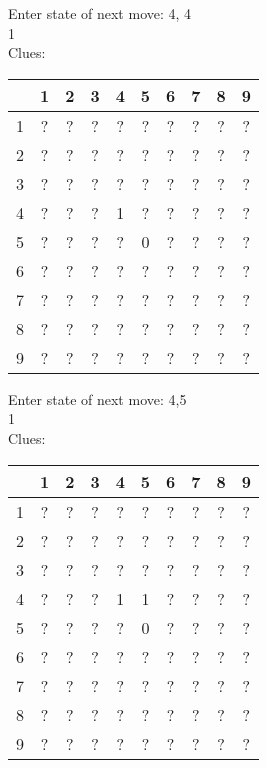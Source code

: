 Enter state of next move: 4, 4\\
1\\
Clues: \\
\begin{tabular}{|c|c|c|c|c|c|c|c|c|c|}
\hline
  & 1 & 2 & 3 & 4 & 5 & 6 & 7 & 8 & 9\\
\hline
1 & ? & ? & ? & ? & ? & ? & ? & ? & ?\\
\hline
2 & ? & ? & ? & ? & ? & ? & ? & ? & ?\\
\hline
3 & ? & ? & ? & ? & ? & ? & ? & ? & ?\\
\hline
4 & ? & ? & ? & 1 & ? & ? & ? & ? & ?\\
\hline
5 & ? & ? & ? & ? & 0 & ? & ? & ? & ?\\
\hline
6 & ? & ? & ? & ? & ? & ? & ? & ? & ?\\
\hline
7 & ? & ? & ? & ? & ? & ? & ? & ? & ?\\
\hline
8 & ? & ? & ? & ? & ? & ? & ? & ? & ?\\
\hline
9 & ? & ? & ? & ? & ? & ? & ? & ? & ?\\
\hline
\end{tabular}

Enter state of next move: 4,5\\
1\\
Clues:\\
\begin{tabular}{|c|c|c|c|c|c|c|c|c|c|}
\hline
  & 1 & 2 & 3 & 4 & 5 & 6 & 7 & 8 & 9\\
\hline
1 & ? & ? & ? & ? & ? & ? & ? & ? & ?\\
\hline
2 & ? & ? & ? & ? & ? & ? & ? & ? & ?\\
\hline
3 & ? & ? & ? & ? & ? & ? & ? & ? & ?\\
\hline
4 & ? & ? & ? & 1 & 1 & ? & ? & ? & ?\\
\hline
5 & ? & ? & ? & ? & 0 & ? & ? & ? & ?\\
\hline
6 & ? & ? & ? & ? & ? & ? & ? & ? & ?\\
\hline
7 & ? & ? & ? & ? & ? & ? & ? & ? & ?\\
\hline
8 & ? & ? & ? & ? & ? & ? & ? & ? & ?\\
\hline
9 & ? & ? & ? & ? & ? & ? & ? & ? & ?\\
\hline
\end{tabular}

